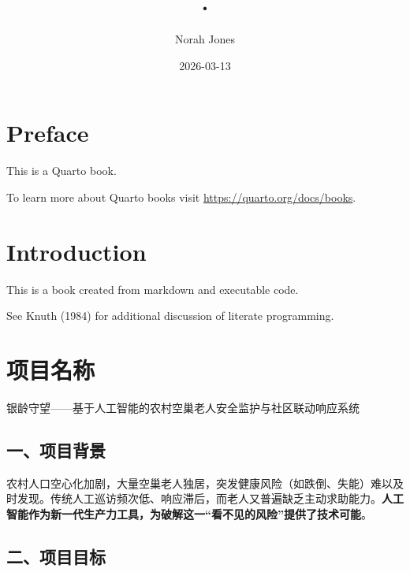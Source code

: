 \documentclass[
  letterpaper,
  DIV=11,
  numbers=noendperiod]{scrreprt}
\title{.}
\author{Norah Jones}
\date{2026-03-13}
\renewcommand*\contentsname{Table of contents}
\newcommand\contentsname{Table of contents}
\begin{document}
\maketitle

\renewcommand*\contentsname{Table of contents}
{
\hypersetup{linkcolor=}
\setcounter{tocdepth}{2}
\tableofcontents
}


\chapter*{Preface}\label{preface}


This is a Quarto book.

To learn more about Quarto books visit
\url{https://quarto.org/docs/books}.


\chapter{Introduction}\label{introduction}

This is a book created from markdown and executable code.

See Knuth (1984) for additional discussion of literate programming.


\chapter{项目名称}\label{ux9879ux76eeux540dux79f0}

银龄守望------基于人工智能的农村空巢老人安全监护与社区联动响应系统

\section{一、项目背景}\label{ux4e00ux9879ux76eeux80ccux666f}

农村人口空心化加剧，大量空巢老人独居，突发健康风险（如跌倒、失能）难以及时发现。传统人工巡访频次低、响应滞后，而老人又普遍缺乏主动求助能力。\textbf{人工智能作为新一代生产力工具，为破解这一``看不见的风险''提供了技术可能}。

\section{二、项目目标}\label{ux4e8cux9879ux76eeux76eeux6807}
\end{document}
